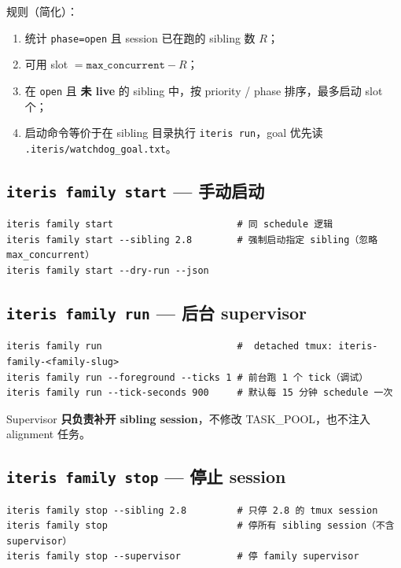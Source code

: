 \documentclass[11pt,a4paper]{ctexart}
\begin{document}
规则（简化）：
\begin{enumerate}[nosep]
  \item 统计 \texttt{phase=open} 且 session 已在跑的 sibling 数 $R$；
  \item 可用 slot $= \texttt{max\_concurrent} - R$；
  \item 在 \texttt{open} 且 \textbf{未 live} 的 sibling 中，按 priority / phase 排序，最多启动 slot 个；
  \item 启动命令等价于在 sibling 目录执行 \texttt{iteris run}，goal 优先读 \texttt{.iteris/watchdog\_goal.txt}。
\end{enumerate}

\subsection{\texttt{iteris family start} — 手动启动}

\begin{lstlisting}[style=shell]
iteris family start                      # 同 schedule 逻辑
iteris family start --sibling 2.8        # 强制启动指定 sibling（忽略 max_concurrent）
iteris family start --dry-run --json
\end{lstlisting}

\subsection{\texttt{iteris family run} — 后台 supervisor}

\begin{lstlisting}[style=shell]
iteris family run                        #  detached tmux: iteris-family-<family-slug>
iteris family run --foreground --ticks 1 # 前台跑 1 个 tick（调试）
iteris family run --tick-seconds 900     # 默认每 15 分钟 schedule 一次
\end{lstlisting}

Supervisor \textbf{只负责补开 sibling session}，不修改 TASK\_POOL，也不注入 alignment 任务。

\subsection{\texttt{iteris family stop} — 停止 session}

\begin{lstlisting}[style=shell]
iteris family stop --sibling 2.8         # 只停 2.8 的 tmux session
iteris family stop                       # 停所有 sibling session（不含 supervisor）
iteris family stop --supervisor          # 停 family supervisor
\end{lstlisting}
\end{document}
